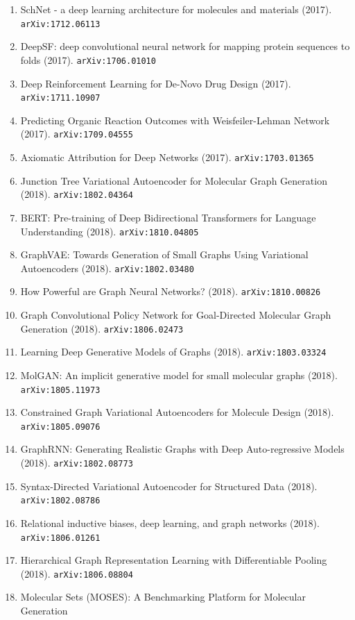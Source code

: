 \documentclass[11pt]{article}
\begin{document}
\begin{enumerate}
  Graphs (2017). \texttt{arXiv:1704.02901}
  \item SchNet - a deep learning architecture for molecules and materials (2017). \texttt{arXiv:1712.06113}
  \item DeepSF: deep convolutional neural network for mapping protein sequences
  to folds (2017). \texttt{arXiv:1706.01010}
  \item Deep Reinforcement Learning for De-Novo Drug Design (2017). \texttt{arXiv:1711.10907}
  \item Predicting Organic Reaction Outcomes with Weisfeiler-Lehman Network (2017). \texttt{arXiv:1709.04555}
  \item Axiomatic Attribution for Deep Networks (2017). \texttt{arXiv:1703.01365}
  \item Junction Tree Variational Autoencoder for Molecular Graph Generation (2018). \texttt{arXiv:1802.04364}
  \item BERT: Pre-training of Deep Bidirectional Transformers for Language
  Understanding (2018). \texttt{arXiv:1810.04805}
  \item GraphVAE: Towards Generation of Small Graphs Using Variational
  Autoencoders (2018). \texttt{arXiv:1802.03480}
  \item How Powerful are Graph Neural Networks? (2018). \texttt{arXiv:1810.00826}
  \item Graph Convolutional Policy Network for Goal-Directed Molecular Graph
  Generation (2018). \texttt{arXiv:1806.02473}
  \item Learning Deep Generative Models of Graphs (2018). \texttt{arXiv:1803.03324}
  \item MolGAN: An implicit generative model for small molecular graphs (2018). \texttt{arXiv:1805.11973}
  \item Constrained Graph Variational Autoencoders for Molecule Design (2018). \texttt{arXiv:1805.09076}
  \item GraphRNN: Generating Realistic Graphs with Deep Auto-regressive Models (2018). \texttt{arXiv:1802.08773}
  \item Syntax-Directed Variational Autoencoder for Structured Data (2018). \texttt{arXiv:1802.08786}
  \item Relational inductive biases, deep learning, and graph networks (2018). \texttt{arXiv:1806.01261}
  \item Hierarchical Graph Representation Learning with Differentiable Pooling (2018). \texttt{arXiv:1806.08804}
  \item Molecular Sets (MOSES): A Benchmarking Platform for Molecular Generation

\end{enumerate}
\end{document}
